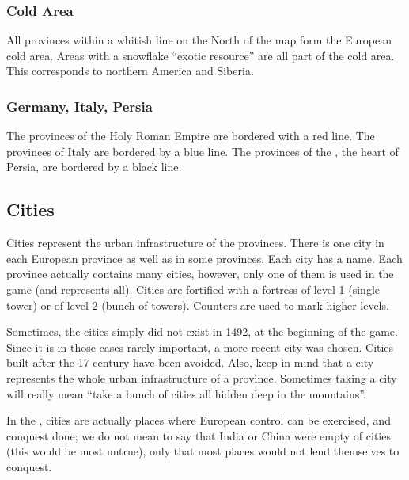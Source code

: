\subsubsection{Cold Area}\label{chBasics:Cold Area}
\aparag[in Europe] All provinces within a whitish line on the North of the map
form the European cold area.
 Areas with a snowflake ``exotic resource'' are all part
of the \ROTW cold area. This corresponds to northern America and Siberia.


\subsubsection{Germany, Italy, Persia}
\aparag The provinces of the Holy Roman Empire are bordered with a red
line.%
\aparag The provinces of Italy are bordered by a blue line.%
\aparag The provinces of the , the heart of Persia, are
bordered by a black line.



\subsection{Cities}

\aparag Cities represent the urban infrastructure of the provinces. There is
one city in each European province as well as in some \ROTW provinces.
\bparag Each city has a name.%
\bparag Each province actually contains many cities, however, only one of them
is used in the game (and represents all).
\aparag[Level] Cities are fortified with a fortress of level 1 (single tower)
or of level 2 (bunch of towers). Counters are used to mark higher levels.
\begin{designnote}
  Sometimes, the cities simply did not exist in 1492, at the beginning of the
  game. Since it is in those cases rarely important, a more recent city was
  chosen. Cities built after the 17 century have been avoided. Also,
  keep in mind that a city represents the whole urban infrastructure of a
  province. Sometimes taking a city will really mean ``take a bunch of cities
  all hidden deep in the mountains''.

  In the \ROTW, cities are actually places where European control can be
  exercised, and conquest done; we do not mean to say that India or China were
  empty of cities (this would be most untrue), only that most places would not
  lend themselves to conquest.
\end{designnote}


